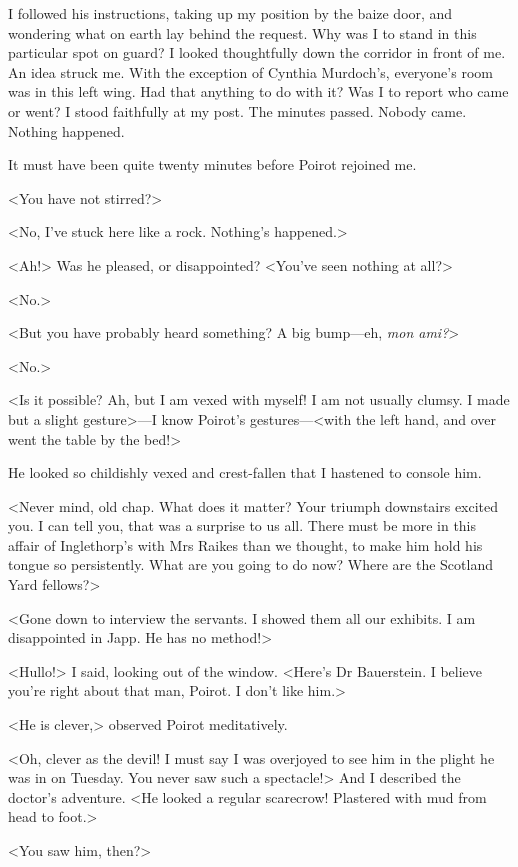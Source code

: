  I followed his instructions, taking up my position by the baize door, and wondering what on earth lay behind the request. Why was I to stand in this particular spot on guard? I looked thoughtfully down the corridor in front of me. An idea struck me. With the exception of Cynthia Murdoch's, everyone's room was in this left wing. Had that anything to do with it? Was I to report who came or went? I stood faithfully at my post. The minutes passed. Nobody came. Nothing happened. 

 It must have been quite twenty minutes before Poirot rejoined me. 

 <You have not stirred?> 

 <No, I've stuck here like a rock. Nothing's happened.> 

 <Ah!> Was he pleased, or disappointed? <You've seen nothing at all?> 

 <No.> 

 <But you have probably heard something? A big bump—eh, \textit{mon ami?}> 

 <No.> 

 <Is it possible? Ah, but I am vexed with myself! I am not usually clumsy. I made but a slight gesture>—I know Poirot's gestures—<with the left hand, and over went the table by the bed!> 

 He looked so childishly vexed and crest-fallen that I hastened to console him. 

 <Never mind, old chap. What does it matter? Your triumph downstairs excited you. I can tell you, that was a surprise to us all. There must be more in this affair of Inglethorp's with Mrs Raikes than we thought, to make him hold his tongue so persistently. What are you going to do now? Where are the Scotland Yard fellows?> 

 <Gone down to interview the servants. I showed them all our exhibits. I am disappointed in Japp. He has no method!> 

 <Hullo!> I said, looking out of the window. <Here's Dr Bauerstein. I believe you're right about that man, Poirot. I don't like him.> 

 <He is clever,> observed Poirot meditatively. 

 <Oh, clever as the devil! I must say I was overjoyed to see him in the plight he was in on Tuesday. You never saw such a spectacle!> And I described the doctor's adventure. <He looked a regular scarecrow! Plastered with mud from head to foot.> 

 <You saw him, then?> 

